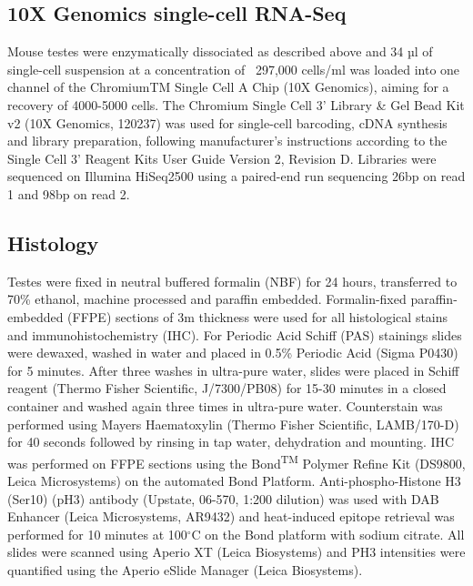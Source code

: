 \subsection{10X Genomics single-cell RNA-Seq}

Mouse testes were enzymatically dissociated as described above and 34 µl of single-cell suspension at a concentration of ~297,000 cells/ml was loaded into one channel of the ChromiumTM Single Cell A Chip (10X Genomics\textsuperscript{\textregistered}), aiming for a recovery of 4000-5000 cells. The Chromium Single Cell 3’ Library \& Gel Bead Kit v2 (10X Genomics\textsuperscript{\textregistered}, 120237) was used for single-cell barcoding, cDNA synthesis and library preparation, following manufacturer’s instructions according to the Single Cell 3’ Reagent Kits User Guide Version 2, Revision D. Libraries were sequenced on Illumina HiSeq2500 using a paired-end run sequencing 26bp on read 1 and 98bp on read 2. 

\subsection{Histology}
Testes were fixed in neutral buffered formalin (NBF) for 24 hours, transferred to 70\% ethanol, machine processed and paraffin embedded. Formalin-fixed paraffin-embedded (FFPE) sections of 3\textmu{}m thickness were used for all histological stains and immunohistochemistry (IHC). For Periodic Acid Schiff (PAS) stainings slides were dewaxed, washed in water and placed in 0.5\% Periodic Acid (Sigma P0430) for 5 minutes. After three washes in ultra-pure water, slides were placed in Schiff reagent (Thermo Fisher Scientific, J/7300/PB08) for 15-30 minutes in a closed container and washed again three times in ultra-pure water. Counterstain was performed using Mayers Haematoxylin (Thermo Fisher Scientific, LAMB/170-D) for 40 seconds followed by rinsing in tap water, dehydration and mounting. IHC was performed on FFPE sections using the Bond\textsuperscript{TM} Polymer Refine Kit (DS9800, Leica Microsystems) on the automated Bond Platform. Anti-phospho-Histone H3 (Ser10) (pH3) antibody (Upstate, 06-570, 1:200 dilution) was used with DAB Enhancer (Leica Microsystems, AR9432) and heat-induced epitope retrieval was performed for 10 minutes at 100$^\circ$C on the Bond platform with sodium citrate. All slides were scanned using Aperio XT (Leica Biosystems) and PH3 intensities were quantified using the Aperio eSlide Manager (Leica Biosystems). 

\newpage

